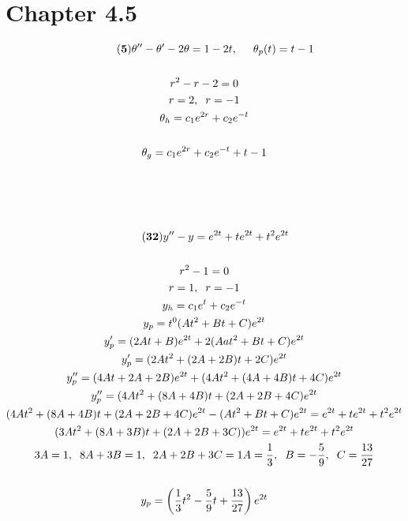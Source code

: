 \documentclass{article}
\begin{document}
\section*{Chapter 4.5}
    \begin{gather*}\tag{\textbf{5}}
        \theta''-\theta'-2\theta=1-2t,\hspace{.5cm}\theta_p(t) = t-1\\\\
        r^2 - r - 2 = 0\\
        r = 2, \hspace{.2cm}r = -1\\
        \theta_h = c_1e^{2r}+c_2e^{-t}\\\\
        \theta_g = c_1e^{2r}+c_2e^{-t} + t - 1\\\\\\\\\\
        \tag{\textbf{32}}
        y''-y=e^{2t}+te^{2t}+t^2e^{2t}\\\\
        r^2-1=0\\
        r = 1, \hspace{.2cm}r = -1\\
        y_h = c_1e^t+c_2e^{-t}\\
        y_p = t^0(At^2+Bt+C)e^{2t}\\
        y'_p = (2At+B)e^{2t}+2(Aat^2+Bt+C)e^{2t}\\
        y'_p = (2At^2+(2A+2B)t+2C)e^{2t}\\
        y''_p = (4At+2A+2B)e^{2t} + (4At^2+(4A+4B)t+4C)e^{2t}\\
        y''_p = (4At^2+(8A+4B)t+(2A+2B+4C)e^{2t}\\
        (4At^2+(8A+4B)t+(2A+2B+4C)e^{2t} - (At^2+Bt+C)e^{2t} = e^{2t}+te^{2t}+t^2e^{2t}\\
        (3At^2+(8A+3B)t+(2A+2B+3C))e^{2t} = e^{2t}+te^{2t}+t^2e^{2t}\\
        3A = 1, \hspace{.2cm}8A+3B = 1,\hspace{.2cm}2A+2B+3C=1
        A = \frac{1}{3}, \hspace{.2cm}B = -\frac{5}{9},\hspace{.2cm}C = \frac{13}{27}\\\\
        y_p = \left(\frac{1}{3}t^2-\frac{5}{9}t+\frac{13}{27}\right)e^{2t}\\
    \end{gather*}
    \newpage
\end{document}
